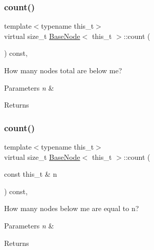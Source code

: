 \subsubsection{\texorpdfstring{count()}{count()}\hspace{0.1cm}{\footnotesize\ttfamily [1/2]}}
{\footnotesize\ttfamily template$<$typename this\+\_\+t$>$ \\
virtual size\+\_\+t \hyperlink{class_base_node}{Base\+Node}$<$ this\+\_\+t $>$\+::count (\begin{DoxyParamCaption}{ }\end{DoxyParamCaption}) const\hspace{0.3cm}{\ttfamily [inline]}, {\ttfamily [virtual]}}

How many nodes total are below me? 
\begin{DoxyParams}{Parameters}
{\em n} & \\
\hline
\end{DoxyParams}
\begin{DoxyReturn}{Returns}

\end{DoxyReturn}
\mbox{\label{class_base_node_aaaf113bd98ee404e71582ac1cf014ac0}} 
\subsubsection{\texorpdfstring{count()}{count()}\hspace{0.1cm}{\footnotesize\ttfamily [2/2]}}
{\footnotesize\ttfamily template$<$typename this\+\_\+t$>$ \\
virtual size\+\_\+t \hyperlink{class_base_node}{Base\+Node}$<$ this\+\_\+t $>$\+::count (\begin{DoxyParamCaption}\item[{const this\+\_\+t \&}]{n }\end{DoxyParamCaption}) const\hspace{0.3cm}{\ttfamily [inline]}, {\ttfamily [virtual]}}

How many nodes below me are equal to n? 
\begin{DoxyParams}{Parameters}
{\em n} & \\
\hline
\end{DoxyParams}
\begin{DoxyReturn}{Returns}

\end{DoxyReturn}
\mbox{\label{class_base_node_adb6326eefe4ddc311651b4a4a5cb119e}} 

